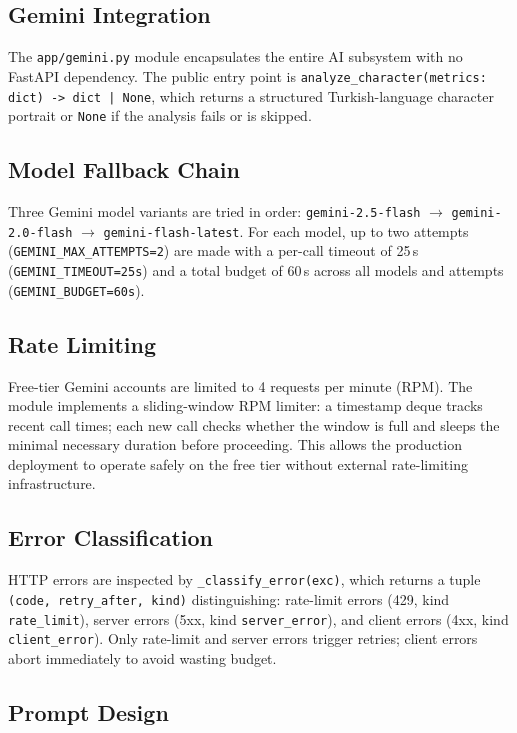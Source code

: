 \documentclass[conference]{IEEEtran}
\begin{document}
\subsection{Gemini Integration}

The \texttt{app/gemini.py} module encapsulates the entire AI subsystem
with no FastAPI dependency. The public entry point is
\texttt{analyze\_character(metrics: dict) -> dict | None}, which returns a
structured Turkish-language character portrait or \texttt{None} if the
analysis fails or is skipped.

\subsection{Model Fallback Chain}

Three Gemini model variants are tried in order:
\texttt{gemini-2.5-flash} $\to$ \texttt{gemini-2.0-flash} $\to$
\texttt{gemini-flash-latest}. For each model, up to two attempts
(\texttt{GEMINI\_MAX\_ATTEMPTS=2}) are made with a per-call timeout of
25\,s (\texttt{GEMINI\_TIMEOUT=25s}) and a total budget of 60\,s across
all models and attempts (\texttt{GEMINI\_BUDGET=60s}).

\subsection{Rate Limiting}

Free-tier Gemini accounts are limited to 4 requests per minute (RPM).
The module implements a sliding-window RPM limiter: a timestamp deque
tracks recent call times; each new call checks whether the window is full
and sleeps the minimal necessary duration before proceeding. This allows
the production deployment to operate safely on the free tier without
external rate-limiting infrastructure.

\subsection{Error Classification}

HTTP errors are inspected by \texttt{\_classify\_error(exc)}, which returns
a tuple \texttt{(code, retry\_after, kind)} distinguishing:
rate-limit errors (429, kind \texttt{rate\_limit}),
server errors (5xx, kind \texttt{server\_error}),
and client errors (4xx, kind \texttt{client\_error}).
Only rate-limit and server errors trigger retries; client errors abort
immediately to avoid wasting budget.

\subsection{Prompt Design}
\end{document}
